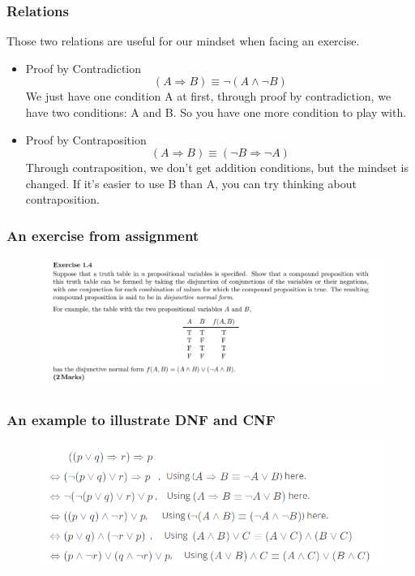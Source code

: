 \documentclass{beamer}
\begin{document}
\begin{frame}
    \frametitle{Relations}
    Those two relations are useful for our mindset when facing an exercise.
    \begin{itemize}
        \item Proof by Contradiction
              \begin{equation*}
                  (A \Rightarrow B) \equiv \neg (A \wedge \neg B)
              \end{equation*}
              We just have one condition A at first, through proof by contradiction, we have two conditions: A and B. So you have one more condition to play with.
        \item Proof by Contraposition
              \begin{equation*}
                  (A\Rightarrow B) \equiv (\neg B \Rightarrow \neg A)
              \end{equation*}
              Through contraposition, we don't get addition conditions, but the mindset is changed. If it's easier to use B than A, you can try thinking about contraposition.
    \end{itemize}
\end{frame}

\begin{frame}
    \frametitle{An exercise from assignment}
    \begin{figure}[htbp]
        \centering
        \includegraphics[width=12cm]{exercise1.png}
    \end{figure}
\end{frame}

\begin{frame}
    \frametitle{An example to illustrate DNF and CNF}
    \begin{figure}[htbp]
        \centering
        \includegraphics[width=12cm]{example1.png}
    \end{figure}
\end{frame}
\end{document}
